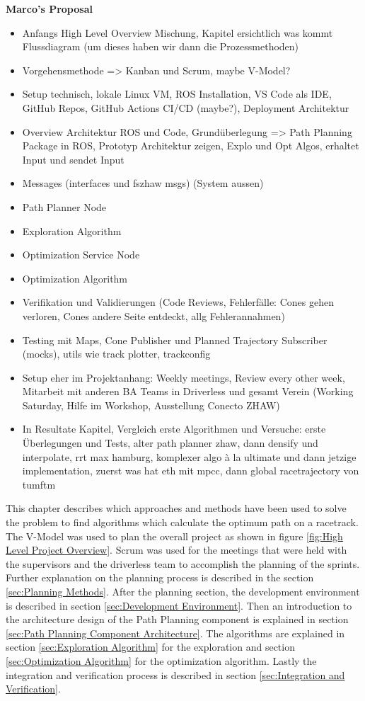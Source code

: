 \textbf{Marco's Proposal}
\begin{itemize}
    \item Anfangs High Level Overview Mischung, Kapitel ersichtlich was kommt Flussdiagram (um dieses haben wir dann die Prozessmethoden)
    \item Vorgehensmethode => Kanban und Scrum, maybe V-Model?
    \item Setup technisch, lokale Linux VM, ROS Installation, VS Code als IDE, GitHub Repos, GitHub Actions CI/CD (maybe?), Deployment Architektur
    \item Overview Architektur ROS und Code, Grundüberlegung => Path Planning Package in ROS, Prototyp Architektur zeigen, Explo und Opt Algos, erhaltet Input und sendet Input
    \item Messages (interfaces und fszhaw msgs) (System aussen)
    \item Path Planner Node
    \item Exploration Algorithm
    \item Optimization Service Node
    \item Optimization Algorithm
    \item Verifikation und Validierungen (Code Reviews, Fehlerfälle: Cones gehen verloren, Cones andere Seite entdeckt, allg Fehlerannahmen)
    \item Testing mit Maps, Cone Publisher und Planned Trajectory Subscriber (mocks), utils wie track plotter, trackconfig
    \item Setup eher im Projektanhang: Weekly meetings, Review every other week, Mitarbeit mit anderen BA Teams in Driverless und gesamt Verein (Working Saturday, Hilfe im Workshop, Ausstellung Conecto ZHAW)
    \item In Resultate Kapitel, Vergleich erste Algorithmen und Versuche: erste Überlegungen und Tests, alter path planner zhaw, dann densify und interpolate, rrt max hamburg, komplexer algo à la ultimate und dann jetzige implementation, zuerst was hat eth mit mpcc, dann global racetrajectory von tumftm
\end{itemize}

This chapter describes which approaches and methods have been used to solve the problem to find algorithms which calculate the optimum path on a racetrack. The V-Model was used to plan the overall project as shown in figure \ref{fig:High Level Project Overview}. Scrum was used for the meetings that were held with the supervisors and the driverless team to accomplish the planning of the sprints. Further explanation on the planning process is described in the section \ref{sec:Planning Methods}. After the planning section, the development environment is described in section \ref{sec:Development Environment}. Then an introduction to the architecture design of the Path Planning component is explained in section \ref{sec:Path Planning Component Architecture}. The algorithms are explained in section \ref{sec:Exploration Algorithm} for the exploration and section \ref{sec:Optimization Algorithm} for the optimization algorithm. Lastly the integration and verification process is described in section \ref{sec:Integration and Verification}.

